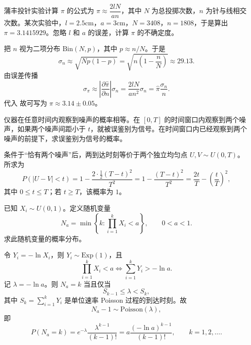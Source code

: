 \begin{question}[7 分]
蒲丰投针实验计算 $\pi$ 的公式为 $\pi\approx\dfrac{2lN}{an}$，其中 $N$ 为总投掷次数，$n$ 为针与线相交次数。某次实验中，$l=2.5\mathrm{cm}$，$a=3\mathrm{cm}$，$N=3408$，$n=1808$，于是算出 $\pi=3.1415929$。忽略 $l$ 和 $a$ 的误差，计算 $\pi$ 的不确定度。
\begin{solution}
把 $n$ 视为二项分布 $\mathrm{Bin}(N,p)$，其中 $p\approx n/N$。于是
\[
\sigma_n\approx \sqrt{Np(1-p)}=\sqrt{n\left(1-\frac{n}{N}\right)}\approx 29.13.
\]
由误差传播
\[
\sigma_{\pi}\approx \left|\frac{\partial \hat\pi}{\partial n}\right|\sigma_n
=\frac{2lN}{a n^2}\sigma_n=\hat\pi\frac{\sigma_n}{n}.
\]
代入
故可写为 $\pi\approx 3.14\pm 0.05$。
\end{solution}
\end{question}

\begin{question}[6 分]
仪器在任意时间内观察到噪声的概率相等。在 $[0,T]$ 的时间窗口内观察到两个噪声，如果两个噪声间距小于 $t$，就被误鉴别为信号。在时间窗口内已经观察到两个噪声的前提下，求误鉴别为信号的概率。
\begin{solution}
条件于“恰有两个噪声”后，两到达时刻等价于两个独立均匀点 $U,V\sim U(0,T)$。所求为
\[
P(|U-V|<t)=1-\frac{2\cdot \frac12(T-t)^2}{T^2}
=1-\frac{(T-t)^2}{T^2}
=\frac{2t}{T}-\left(\frac{t}{T}\right)^2,
\]
其中 $0\le t\le T$；若 $t\ge T$，该概率为 $1$。
\end{solution}
\end{question}

\begin{question}
已知 $X_i\sim U(0,1)$。定义随机变量
\[
N_a=\min\left\{k:\prod_{i=1}^{k}X_i<a\right\},\qquad 0<a<1.
\]
求此随机变量的概率分布。
\begin{solution}
令 $Y_i=-\ln X_i$，则 $Y_i\sim \mathrm{Exp}(1)$，且
\[
\prod_{i=1}^k X_i<a
\iff \sum_{i=1}^k Y_i>-\ln a.
\]
记 $\lambda=-\ln a$。则 $N_a=k$ 当且仅当
\[
S_{k-1}\le \lambda<S_k,
\]
其中 $S_k=\sum_{i=1}^k Y_i$ 是单位速率 Poisson 过程的到达时刻。故
\[
N_a-1\sim \mathrm{Poisson}(\lambda),
\]
即
\[
P(N_a=k)=e^{-\lambda}\frac{\lambda^{k-1}}{(k-1)!}
=a\frac{(-\ln a)^{k-1}}{(k-1)!},
\qquad k=1,2,\dots.
\]
\end{solution}
\end{question}


